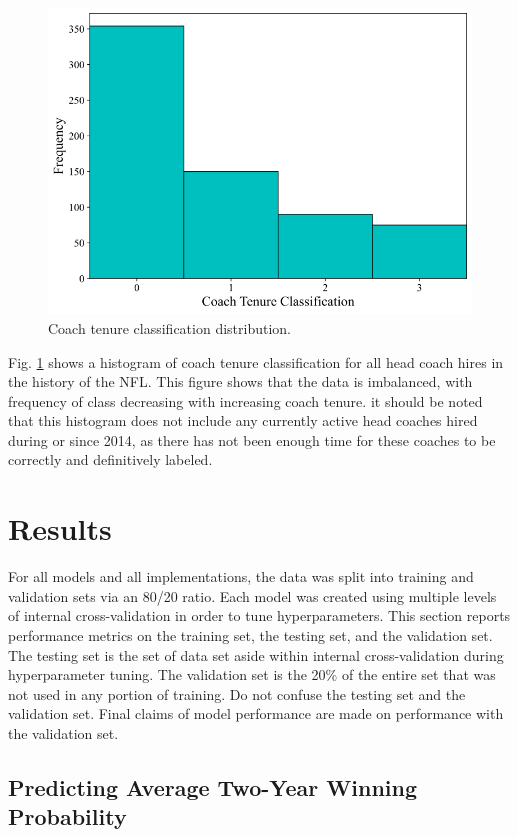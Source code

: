 \documentclass[conference]{IEEEtran}
\begin{document}
\begin{figure}[htbp]
\centerline{\includegraphics[width=1\linewidth]{hist2.png}}
\caption{Coach tenure classification distribution.}
\label{fig3}
\end{figure}

Fig. \ref{fig3} shows a histogram of coach tenure classification for all head coach hires in the history of the NFL. This figure shows that the data is imbalanced, with frequency of class decreasing with increasing coach tenure. it should be noted that this histogram does not include any currently active head coaches hired during or since 2014, as there has not been enough time for these coaches to be correctly and definitively labeled.

\section{Results}
For all models and all implementations, the data was split into training and validation sets via an 80/20 ratio. Each model was created using multiple levels of internal cross-validation in order to tune hyperparameters. This section reports performance metrics on the training set, the testing set, and the validation set. The testing set is the set of data set aside within internal cross-validation during hyperparameter tuning. The validation set is the 20\% of the entire set that was not used in any portion of training. Do not confuse the testing set and the validation set. Final claims of model performance are made on performance with the validation set.

\subsection{Predicting Average Two-Year Winning Probability}
\end{document}

